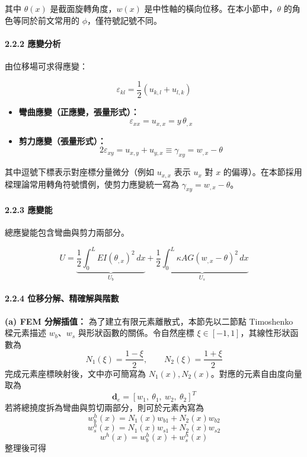 ﻿\documentclass[UTF8, a4paper, 12pt]{ctexart}
\begin{document}
其中 $\theta(x)$ 是截面旋轉角度，$w(x)$ 是中性軸的橫向位移。在本小節中，$\theta$ 的角色等同於前文常用的 $\phi$，僅符號記號不同。

\paragraph{2.2.2 應變分析}

由位移場可求得應變：

\begin{equation}
  \varepsilon_{kl}=\frac{1}{2}\left(u_{k,l}+u_{l,k}\right)
\end{equation}

\begin{itemize}
  \item \textbf{彎曲應變（正應變，張量形式）：}
  $$\varepsilon_{xx}=u_{x,x}=y\,\theta_{,x}$$
  
  \item \textbf{剪力應變（張量形式）：}
  $$2\varepsilon_{xy}=u_{x,y}+u_{y,x}\equiv\gamma_{xy}=w_{,x}-\theta$$
\end{itemize}

其中逗號下標表示對座標分量微分（例如 $u_{x,x}$ 表示 $u_x$ 對 $x$ 的偏導）。在本節採用樑理論常用轉角符號慣例，使剪力應變統一寫為 $\gamma_{xy}=w_{,x}-\theta$。

\paragraph{2.2.3 應變能}

總應變能包含彎曲與剪力兩部分。

$$U = \underbrace{\frac{1}{2}\int_0^L EI\left(\theta_{,x}\right)^2\,dx}_{U_b} + \underbrace{\frac{1}{2}\int_0^L \kappa AG\left(w_{,x} - \theta\right)^2\,dx}_{U_s}$$

\paragraph{2.2.4 位移分解、精確解與階數}

\textbf{(a) FEM 分解插值：}
為了建立有限元素離散式，本節先以二節點 Timoshenko 樑元素描述 $w_b$、$w_s$ 與形狀函數的關係。令自然座標 $\xi \in [-1,1]$，其線性形狀函數為
\begin{equation}
  N_1(\xi)=\frac{1-\xi}{2},\qquad
  N_2(\xi)=\frac{1+\xi}{2}
\end{equation}
完成元素座標映射後，文中亦可簡寫為 $N_1(x),N_2(x)$。對應的元素自由度向量取為
\begin{equation}
  \mathbf{d}_e=[w_1,\ \theta_1,\ w_2,\ \theta_2]^T
\end{equation}
若將總撓度拆為彎曲與剪切兩部分，則可於元素內寫為
\begin{equation}
  w_b^h(x)=N_1(x)w_{b1}+N_2(x)w_{b2}
\end{equation}
\begin{equation}
  w_s^h(x)=N_1(x)w_{s1}+N_2(x)w_{s2}
\end{equation}
\begin{equation}
  w^h(x)=w_b^h(x)+w_s^h(x)
\end{equation}
整理後可得
\end{document}
